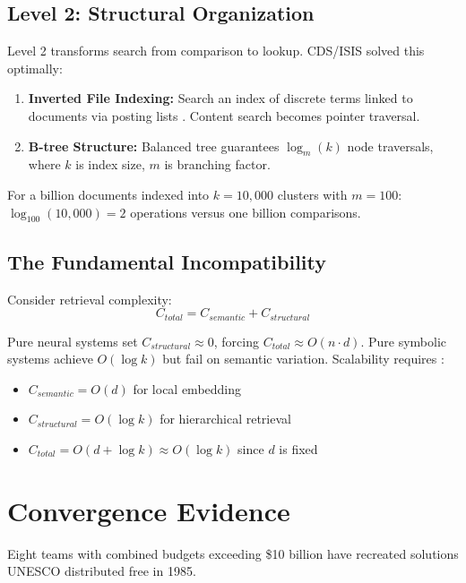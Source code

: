 \documentclass[manuscript,screen,nonacm]{acmart}
\begin{document}
\subsection{Level 2: Structural Organization}

Level 2 transforms search from comparison to lookup. CDS/ISIS solved this optimally:
\begin{enumerate}
    \item \textbf{Inverted File Indexing:} Search an index of discrete terms linked to documents via posting lists \cite{zobel2006}. Content search becomes pointer traversal.
    \item \textbf{B-tree Structure:} Balanced tree guarantees $\log_m(k)$ node traversals, where $k$ is index size, $m$ is branching factor.
\end{enumerate}

For a billion documents indexed into $k=10,000$ clusters with $m=100$: $\log_{100}(10,000) = 2$ operations versus one billion comparisons.

\subsection{The Fundamental Incompatibility}

Consider retrieval complexity:
\[ C_{total} = C_{semantic} + C_{structural} \]

Pure neural systems set $C_{structural} \approx 0$, forcing $C_{total} \approx O(n \cdot d)$. Pure symbolic systems achieve $O(\log k)$ but fail on semantic variation. Scalability requires \cite{chen2025}:
\begin{itemize}
    \item $C_{semantic} = O(d)$ for local embedding
    \item $C_{structural} = O(\log k)$ for hierarchical retrieval
    \item $C_{total} = O(d + \log k) \approx O(\log k)$ since $d$ is fixed
\end{itemize}

\section{Convergence Evidence}

Eight teams with combined budgets exceeding \$10 billion have recreated solutions UNESCO distributed free in 1985.
\end{document}
